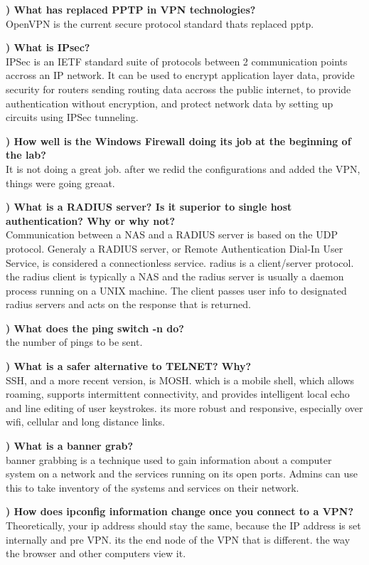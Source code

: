 \documentclass{report}
\newcommand{\mysubsection}[2]{\textbf{\romannumeral #1) #2}}
\begin{document}
\noindent\mysubsection{3}{What has replaced PPTP in VPN technologies?  }
\\OpenVPN is the current secure protocol standard thats replaced pptp.

\noindent\mysubsection{4}{What is IPsec?}
\\IPSec is an IETF standard suite of protocols between 2 communication points
accross an IP network. It can be used to encrypt application layer data,
provide security for routers sending routing data accross the public internet,
to provide authentication without encryption, and protect network data by
setting up circuits using IPSec tunneling.

\noindent\mysubsection{5}{How well is the Windows Firewall doing its job at the beginning of the lab?}
\\It is not doing a great job. after we redid the configurations and added the
VPN, things were going greaat. 

\noindent\mysubsection{6}{What is a RADIUS server?  Is it superior to single host authentication? Why or why not?}
\\Communication between a NAS and a RADIUS server is based on the UDP protocol.
Generaly a RADIUS server, or Remote Authentication Dial-In User Service, is
considered a connectionless service. radius is a client/server protocol. the
radius client is typically a NAS and the radius server is usually a daemon
process running on a UNIX machine. The client passes user info to designated
radius servers and acts on the response that is returned.

\noindent\mysubsection{7}{What does the ping switch -n do?}
\\the number of pings to be sent.

\noindent\mysubsection{8}{What is a safer alternative to TELNET?  Why?}
\\SSH, and a more recent version, is MOSH. which is a mobile shell, which
allows roaming, supports intermittent connectivity, and provides intelligent
local echo and line editing of user keystrokes. its more robust and responsive,
especially over wifi, cellular and long distance links.

\noindent\mysubsection{9}{What is a banner grab?}
\\banner grabbing is a technique used to gain information about a computer
system on a network and the services running on its open ports. Admins can use
this to take inventory of the systems and services on their network.

\noindent\mysubsection{10}{How does ipconfig information change once you connect to a VPN?}
\\Theoretically, your ip address should stay the same, because the IP address
is set internally and pre VPN. its the end node of the VPN that is different.
the way the browser and other computers view it.
\end{document}

